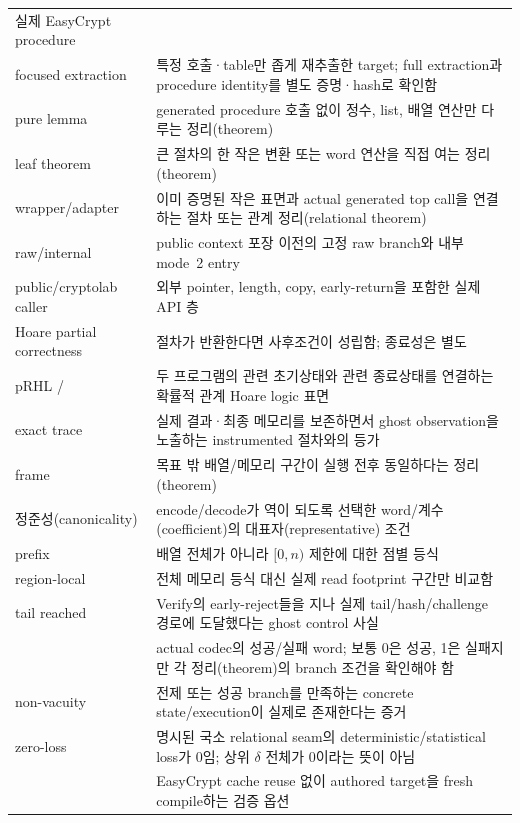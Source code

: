 \begin{longtable}{L{37mm} L{110mm}}
실제 EasyCrypt procedure \\
focused extraction & 특정 호출·table만 좁게 재추출한 target; full extraction과
procedure identity를 별도 증명·hash로 확인함 \\
pure lemma & generated procedure 호출 없이 정수, list, 배열 연산만 다루는
정리(theorem) \\
leaf theorem & 큰 절차의 한 작은 변환 또는 word 연산을 직접 여는 정리(theorem) \\
wrapper/adapter & 이미 증명된 작은 표면과 actual generated top call을 연결하는
절차 또는 관계 정리(relational theorem) \\
raw/internal & public context 포장 이전의 고정 raw branch와 내부 mode~2 entry \\
public/cryptolab caller & 외부 pointer, length, copy, early-return을 포함한 실제 API 층 \\
Hoare partial correctness & 절차가 반환한다면 사후조건이 성립함; 종료성은 별도 \\
pRHL /  & 두 프로그램의 관련 초기상태와 관련 종료상태를
연결하는 확률적 관계 Hoare logic 표면 \\
exact trace & 실제 결과·최종 메모리를 보존하면서 ghost observation을 노출하는
instrumented 절차와의 등가 \\
frame & 목표 밖 배열/메모리 구간이 실행 전후 동일하다는 정리(theorem) \\
정준성(canonicality) & encode/decode가 역이 되도록 선택한
word/계수(coefficient)의 대표자(representative) 조건 \\
prefix & 배열 전체가 아니라 \([0,n)\) 제한에 대한 점별 등식 \\
region-local & 전체 메모리 등식 대신 실제 read footprint 구간만 비교함 \\
tail reached & Verify의 early-reject들을 지나 실제 tail/hash/challenge 경로에
도달했다는 ghost control 사실 \\
 & actual codec의 성공/실패 word; 보통 0은 성공, 1은 실패지만
각 정리(theorem)의 branch 조건을 확인해야 함 \\
non-vacuity & 전제 또는 성공 branch를 만족하는 concrete state/execution이 실제로
존재한다는 증거 \\
zero-loss & 명시된 국소 relational seam의 deterministic/statistical loss가 0임;
상위 \(\delta\) 전체가 0이라는 뜻이 아님 \\
 & EasyCrypt cache reuse 없이 authored target을 fresh compile하는
검증 옵션 \\
\bottomrule
\end{longtable}

